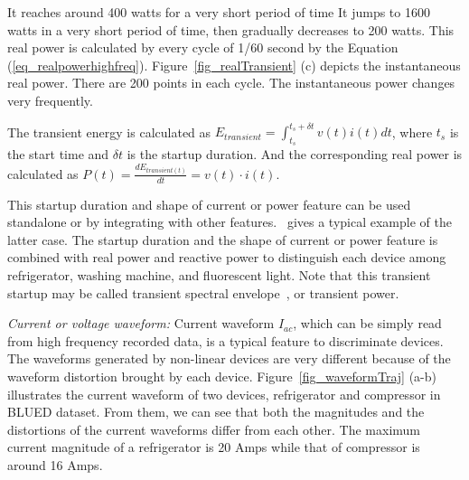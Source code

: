 It reaches around 400 watts for a very short period of time 
\fi 
It jumps to 1600 watts in a very short period of time, then gradually decreases to 200 watts. 
This real power is calculated by every cycle of 1/60 second by the Equation (\ref{eq_realpowerhighfreq}). 
Figure~\ref{fig_realTransient} (c) depicts the instantaneous real power. 
There are 200 points in each cycle. The instantaneous power changes very frequently.

The transient energy %
is calculated as 
$E_{transient} = \int_{t_s}^{t_s+\delta t} v(t)i(t)dt $, 
where $t_s$ is the start time and $\delta t$ is the startup duration. 
And the corresponding real power is calculated as 
$P(t) = \frac{dE_{transient(t)}}{dt} = v(t)\cdot i(t)$.
\iffalse
\manishc{this is confusing, is ``transient power'' ``transient real power''?
  what is the unit of transient power? is it Watts? from your equation of
  $P_{transient}$ it appears to be Watt Second? can you verify these
  equations, and explain how transient power is different from real power. I
  initially thought that transient power is just the power during the
  transient period; is that correct?}\huijuanc{already verified the equation and changed it.}
\fi  

This startup duration and shape of current or power feature can be used 
standalone or by integrating with other features.~\cite{sultanem1991using} gives a typical example of the latter case. 
The startup duration and the shape of current or power feature 
is combined with real power and reactive power
to distinguish each device among refrigerator, washing machine, and fluorescent light.
Note that 
this transient startup may be called transient spectral envelope~\cite{shaw2000PhdThesis}, 
or transient power. 

\textit{Current or voltage waveform:}
Current waveform $I_{ac}$, which can be simply read from
high frequency recorded data,
is a typical feature to discriminate devices.
The waveforms generated by non-linear devices  are 
very different because of the waveform distortion 
brought by each device. 
Figure~\ref{fig_waveformTraj} (a-b)
illustrates the current waveform 
of two devices, refrigerator and compressor in BLUED dataset. 
From them, we can see that both the magnitudes  and the distortions 
of the current waveforms differ from each other. 
The maximum current magnitude of a refrigerator is 20 Amps while that of 
compressor is around 16 Amps. 
% 

